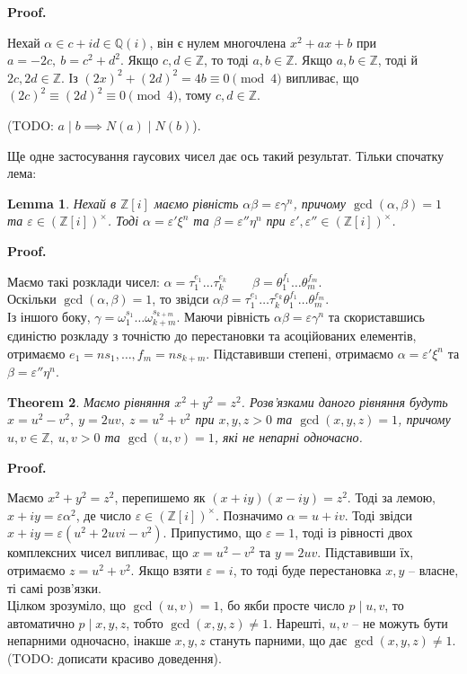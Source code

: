 \documentclass[a4paper, 10pt]{article}
\makeatletter
\theoremstyle{theoremdd}
\newtheorem{theorem}{Theorem}[subsection]
\theoremstyle{theoremdd}
\theoremstyle{theoremdd}
\theoremstyle{theoremdd}
\theoremstyle{theoremdd}
\theoremstyle{theoremdd}
\theoremstyle{theoremdd}
\theoremstyle{theoremdd}
\theoremstyle{theoremdd}
\theoremstyle{theoremdd}
\theoremstyle{theoremdd}
\theoremstyle{theoremdd}
\theoremstyle{theoremdd}
\newtheorem{lemma}[theorem]{Lemma}
\theoremstyle{theoremdd}
\theoremstyle{theoremdd}
\renewenvironment{proof}[1][Proof.\\]{\par
\pushQED{\hfill \qed}%
\normalfont \topsep6\p@\@plus6\p@\relax
\trivlist
\item\relax
{\bfseries
#1\@addpunct{.}}\hspace\labelsep\ignorespaces
}{%
\popQED\endtrivlist\@endpefalse
}
\makeatother
\begin{document}
\begin{proof}
Нехай $\alpha \in c+id \in \mathbb{Q}(i)$, він є нулем многочлена $x^2 + a x + b$ при $a = -2c,\ b = c^2+d^2$. Якщо $c,d \in \mathbb{Z}$, то тоді $a,b \in \mathbb{Z}$. Якщо $a,b \in \mathbb{Z}$, тоді й $2c,2d \in \mathbb{Z}$. Із $(2x)^2 + (2d)^2 = 4b \equiv 0 \pmod 4$ випливає, що $(2c)^2 \equiv (2d)^2 \equiv 0 \pmod 4$, тому $c,d \in \mathbb{Z}$.
\end{proof}

(TODO: $a \mid b \implies N(a) \mid N(b)$).

Ще одне застосування гаусових чисел дає ось такий результат. Тільки спочатку лема:
\begin{lemma}
Нехай в $\mathbb{Z}[i]$ маємо рівність $\alpha \beta = \varepsilon \gamma^n$, причому $\gcd(\alpha,\beta) = 1$ та $\varepsilon \in (\mathbb{Z}[i])^\times$. Тоді $\alpha = \varepsilon' \xi^n$ та $\beta = \varepsilon'' \eta^n$ при $\varepsilon',\varepsilon'' \in (\mathbb{Z}[i])^\times$.
\end{lemma}

\begin{proof}
Маємо такі розклади чисел: $\alpha = \tau_1^{e_1} \dots \tau_k^{e_k} \qquad \beta = \theta_1^{f_1} \dots \theta_m^{f_m}$.\\
Оскільки $\gcd(\alpha,\beta) = 1$, то звідси $\alpha \beta = \tau_1^{e_1} \dots \tau_k^{e_k} \theta_1^{f_1} \dots \theta_m^{f_m}$.\\
Із іншого боку, $\gamma = \omega_1^{s_1} \dots \omega_{k+m}^{s_{k+m}}$. Маючи рівність $\alpha \beta = \varepsilon \gamma^n$ та скориставшись єдиністю розкладу з точністю до перестановки та асоційованих елементів, отримаємо $e_1 = n s_1, \dots, f_m = n s_{k+m}$. Підставивши степені, отримаємо $\alpha = \varepsilon' \xi^n$ та $\beta = \varepsilon'' \eta^n$.
\end{proof}

\begin{theorem}
Маємо рівняння $x^2 + y^2 = z^2$. Розв'язками даного рівняння будуть $x = u^2 - v^2,\ y = 2uv,\ z = u^2 + v^2$ при $x,y,z > 0$ та $\gcd(x,y,z) = 1$, причому $u,v \in \mathbb{Z},\ u,v > 0$ та $\gcd(u,v) = 1$, які не непарні одночасно.
\end{theorem}

\begin{proof}
Маємо $x^2 + y^2 = z^2$, перепишемо як $(x+iy)(x-iy) = z^2$. Тоді за лемою, $x+iy = \varepsilon \alpha^2$, де число $\varepsilon \in (\mathbb{Z}[i])^\times$. Позначимо $\alpha = u+iv$. Тоді звідси $x + iy = \varepsilon (u^2 + 2uvi - v^2)$. Припустимо, що $\varepsilon = 1$, тоді із рівності двох комплексних чисел випливає, що $x = u^2 - v^2$ та $y = 2uv$. Підставивши їх, отримаємо $z = u^2+v^2$. Якщо взяти $\varepsilon = i$, то тоді буде перестановка $x,y$ -- власне, ті самі розв'язки.\\
Цілком зрозуміло, що $\gcd(u,v) = 1$, бо якби просте число $p \mid u,v$, то автоматично $p \mid x,y,z$, тобто $\gcd(x,y,z) \neq 1$. Нарешті, $u,v$ -- не можуть бути непарними одночасно, інакше $x,y,z$ стануть парними, що дає $\gcd(x,y,z) \neq 1$.\\
(TODO: дописати красиво доведення).
\end{proof}
\end{document}
